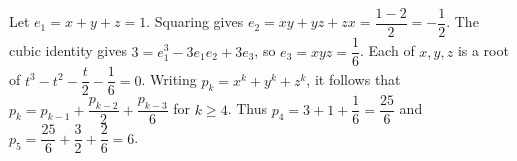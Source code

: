 Let $e_1=x+y+z=1$. Squaring gives $e_2=xy+yz+zx=\dfrac{1-2}{2}=-\dfrac{1}{2}$. The cubic identity gives $3=e_1^3-3e_1e_2+3e_3$, so $e_3=xyz=\dfrac{1}{6}$. Each of $x,y,z$ is a root of $t^3-t^2-\dfrac{t}{2}-\dfrac{1}{6}=0$. Writing $p_k=x^k+y^k+z^k$, it follows that $p_k=p_{k-1}+\dfrac{p_{k-2}}{2}+\dfrac{p_{k-3}}{6}$ for $k\ge4$. Thus $p_4=3+1+\dfrac{1}{6}=\dfrac{25}{6}$ and $p_5=\dfrac{25}{6}+\dfrac{3}{2}+\dfrac{2}{6}=\boxed6$.
